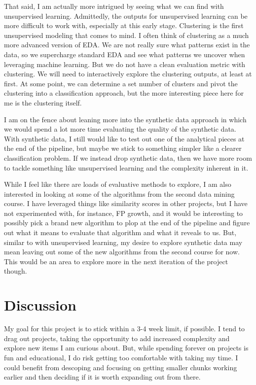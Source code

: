 \documentclass[sigconf, authorversion, nonacm]{acmart}
\begin{document}
    That said, I am actually more intrigued by seeing what we can find with unsupervised learning. Admittedly, the outputs for unsupervised learning can be more difficult to work with, especially at this early stage. Clustering is the first unsupervised modeling that comes to mind. I often think of clustering as a much more advanced version of EDA. We are not really sure what patterns exist in the data, so we supercharge standard EDA and see what patterns we uncover when leveraging machine learning. But we do not have a clean evaluation metric with clustering. We will need to interactively explore the clustering outputs, at least at first. At some point, we can determine a set number of clusters and pivot the clustering into a classification approach, but the more interesting piece here for me is the clustering itself.

    I am on the fence about leaning more into the synthetic data approach in which we would spend a lot more time evaluating the quality of the synthetic data. With synthetic data, I still would like to test out one of the analytical pieces at the end of the pipeline, but maybe we stick to something simpler like a clearer classification problem. If we instead drop synthetic data, then we have more room to tackle something like unsupervised learning and the complexity inherent in it.

    While I feel like there are loads of evaluative methods to explore, I am also interested in looking at some of the algorithms from the second data mining course. I have leveraged things like similarity scores in other projects, but I have not experimented with, for instance, FP growth, and it would be interesting to possibly pick a brand new algorithm to plop at the end of the pipeline and figure out what it means to evaluate that algorithm and what it reveals to us. But, similar to with unsupervised learning, my desire to explore synthetic data may mean leaving out some of the new algorithms from the second course for now. This would be an area to explore more in the next iteration of the project though.

\section{Discussion}
    My goal for this project is to stick within a 3-4 week limit, if possible. I tend to drag out projects, taking the opportunity to add increased complexity and explore new items I am curious about. But, while spending forever on projects is fun and educational, I do risk getting too comfortable with taking my time. I could benefit from descoping and focusing on getting smaller chunks working earlier and then deciding if it is worth expanding out from there.
\end{document}
